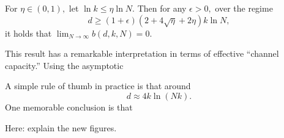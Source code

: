 \begin{proposition} \label{prop:sufficient-cond}
	For $\eta \in (0, 1),$ let $\ln k \le \eta \ln N.$ Then for any $\epsilon > 0,$ over the regime
	$$
	d \ge (1 + \epsilon) (2 + 4 \sqrt \eta + 2 \eta) k \ln N,
	$$
	it holds that $\lim_{N \to \infty} b(d, k, N) = 0.$
\end{proposition}

This result has a remarkable interpretation in terms of effective ``channel capacity.'' Using the asymptotic

A simple rule of thumb in practice is that around
$$
d \approx 4 k \ln (N k).
$$
One memorable conclusion is that

\begin{tcolorbox}
Here: explain the new figures.
\end{tcolorbox}







